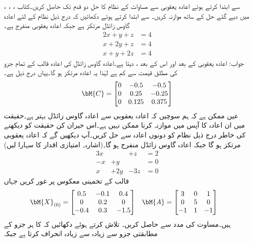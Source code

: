 \quad
{}، ، ،  سے ابتدا کرتے ہوئے اعادہ یعقوبی سے مساوات  کے نظام  کا حل دو قدم تک حاصل کریں۔کتاب میں دیے گئے حل کے ساتھ موازنہ کریں۔
\quad
{} سے ابتدا کرتے ہوئے دکھائیں کہ درج ذیل نظام کے لئے اعادہ گاوس زائڈل مرتکز ہے جبکہ اعادہ یعقوبی منفرج ہے۔
\begin{align*}
2x+y+z&=4\\
x+2y+z&=4\\
x+y+2z&=4
\end{align*}
جواب:\quad
اعادہ یعقوبی  کے بعد  اور اس کے بعد ،  دیتا ہے۔اعادہ گاوس زائڈل کی اعادہ قالب  کے تمام جزو کی مطلق قیمت  سے کم ہے لہٰذا یہ اعادہ مرتکز ہو گا۔یہاں  درج ذیل ہے۔
\begin{align*}
\bM{C}=
\begin{bmatrix}
0&-0.5&-0.5\\
0&0.25&-0.25\\
0&0.125&0.375
\end{bmatrix}
\end{align*}
\quad
عین ممکن ہے کہ ہم سوچیں کہ اعادہ یعقوبی سے  اعادہ گاوس زائڈل بہتر ہے۔حقیقت میں ان اعادہ کا آپس میں موازنہ کرنا ممکن نہیں ہے۔اس حیران کن حقیقت کو دیکھنے کی خاطر درج ذیل نظام کو دونوں اعادہ سے حل کریں۔آپ دیکھیں گے کہ اعادہ یعقوبی مرتکز ہو گا جبکہ اعادہ گاوس زائڈل منفرج ہو گا۔(اشارہ۔ امتیازی اقدار کا سہارا لیں)
\begin{alignat*}{3}
x&{}&+z&=2\\
-x&+y&{}&=0\\
x&+2y&-3z&=0
\end{alignat*}  
\quad
قالب  کے  تخمینی معکوس  پر غور کریں جہاں
\begin{align*}
\bM{X}_{(0)}&=\begin{bmatrix} 0.5&-0.1&0.4\\0&0.2&0\\-0.4&0.3&-1.5 \end{bmatrix} & \bM{A}&=
\begin{bmatrix}
3&0&1\\0&5&0\\-1&1&-1
\end{bmatrix}
\end{align*}
ہیں۔مساوت  کی مدد سے  حاصل کریں۔ تلاش کرتے ہوئے دکھائیں کہ  کا ہر جزو  کے مطابقتی جزو سے زیادہ سے زیادہ  انحراف کرتا ہے جبکہ
